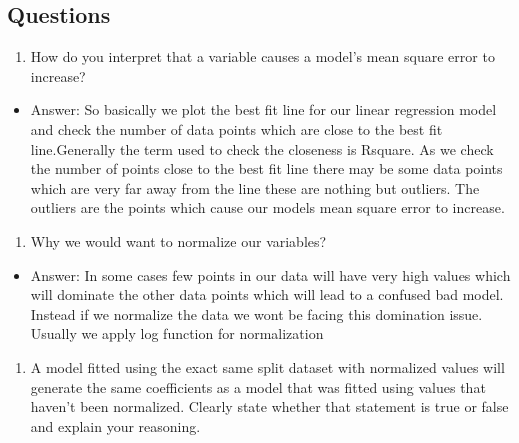 \documentclass[11pt]{article}
\providecommand{\tightlist}{%
      \setlength{\itemsep}{0pt}\setlength{\parskip}{0pt}}
\begin{document}
    \hypertarget{questions}{%
\subsection{Questions}\label{questions}}

\begin{enumerate}
\def\labelenumi{\arabic{enumi}.}
\tightlist
\item
  How do you interpret that a variable causes a model's mean square
  error to increase?
\end{enumerate}

\begin{itemize}
\tightlist
\item
  Answer: So basically we plot the best fit line for our linear
  regression model and check the number of data points which are close
  to the best fit line.Generally the term used to check the closeness is
  Rsquare. As we check the number of points close to the best fit line
  there may be some data points which are very far away from the line
  these are nothing but outliers. The outliers are the points which
  cause our models mean square error to increase.
\end{itemize}

\begin{enumerate}
\def\labelenumi{\arabic{enumi}.}
\setcounter{enumi}{1}
\tightlist
\item
  Why we would want to normalize our variables?
\end{enumerate}

\begin{itemize}
\tightlist
\item
  Answer: In some cases few points in our data will have very high
  values which will dominate the other data points which will lead to a
  confused bad model. Instead if we normalize the data we wont be facing
  this domination issue. Usually we apply log function for normalization
\end{itemize}

\begin{enumerate}
\def\labelenumi{\arabic{enumi}.}
\setcounter{enumi}{2}
\tightlist
\item
  A model fitted using the exact same split dataset with normalized
  values will generate the same coefficients as a model that was fitted
  using values that haven't been normalized. Clearly state whether that
  statement is true or false and explain your reasoning.
\end{enumerate}
\end{document}
